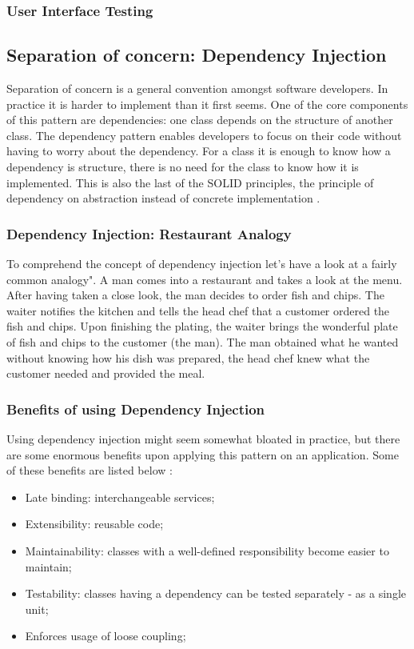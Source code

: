 \subsubsection{User Interface Testing}
\subsection{Separation of concern: Dependency Injection}
Separation of concern is a general convention amongst software developers. In practice it is harder to implement than it first seems. One of the core components of this pattern are dependencies: one class depends on the structure of another class. The dependency pattern enables developers to focus on their code without having to worry about the dependency. For a class it is enough to know how a dependency is structure, there is no need for the class to know how it is implemented. This is also the last of the SOLID principles, the principle of dependency on abstraction instead of concrete implementation \cite{BhavyaKaria2018}.
\subsubsection{Dependency Injection: Restaurant Analogy}
To comprehend the concept of dependency injection let's have a look at a fairly common analogy". A man comes into a restaurant and takes a look at the menu. After having taken a close look, the man decides to order fish and chips. The waiter notifies the kitchen and tells the head chef that a customer ordered the fish and chips. Upon finishing the plating, the waiter brings the wonderful plate of fish and chips to the customer (the man). The man obtained what he wanted without knowing how his dish was prepared, the head chef knew what the customer needed and provided the meal.
\subsubsection{Benefits of using Dependency Injection}
Using dependency injection might seem somewhat bloated in practice, but there are some enormous benefits upon applying this pattern on an application. Some of these benefits are listed below \cite{Seemann2011}:
\begin{itemize}
\item Late binding: interchangeable services;
\item Extensibility: reusable code;
\item Maintainability: classes with a well-defined responsibility become easier to maintain;
\item Testability: classes having a dependency can be tested separately - as a single unit; 
\item Enforces usage of loose coupling;
\end{itemize}
